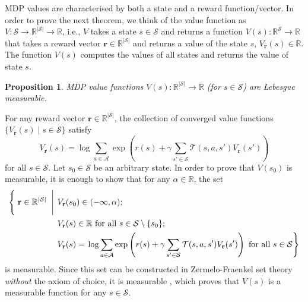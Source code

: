 \documentclass{article}
\newtheorem{proposition}[theorem]{Proposition}
\newenvironment{proofsketch}{%
  \renewcommand{\proofname}{Proof sketch}\proof}{\endproof}
\theoremstyle{definition}
\begin{document}
MDP values are characterised by both a state and a reward function/vector. In
order to prove the next theorem, we think of the value function as $V :
\mathcal{S} \to \mathbb{R}^{|\mathcal{S}|} \to \mathbb{R}$, i.e., $V$ takes a
state $s \in \mathcal{S}$ and returns a function $V(s) :
\mathbb{R}^{\mathcal{S}} \to \mathbb{R}$ that takes a reward vector $\mathbf{r}
\in \mathbb{R}^{|\mathcal{S}|}$ and returns a value of the state $s$,
$V_{\mathbf{r}}(s) \in \mathbb{R}$. The function $V(s)$ computes the values of
all states and returns the value of state $s$.

\begin{proposition} \label{thm:measurability}
  MDP value functions $V(s) : \mathbb{R}^{|\mathcal{S}|} \to \mathbb{R}$ (for $s
  \in \mathcal{S}$) are Lebesgue measurable.
\end{proposition}
\begin{proofsketch}
  For any reward vector $\mathbf{r} \in \mathbb{R}^{|\mathcal{S}|}$, the
  collection of converged value functions $\{ V_{\mathbf{r}}(s) \mid s \in
  \mathcal{S} \}$ satisfy
  \[
    V_{\mathbf{r}}(s) = \log \sum_{a \in \mathcal{A}}
    \exp\left( r(s) + \gamma\sum_{s' \in \mathcal{S}} \mathcal{T}(s, a,
      s')V_{\mathbf{r}}(s') \right)
  \]
  for all $s \in \mathcal{S}$. Let $s_0 \in \mathcal{S}$ be an arbitrary state.
  In order to prove that $V(s_0)$ is measurable, it is enough to show that for
  any $\alpha \in \mathbb{R}$, the set
  \[
    \begin{split}
      \left\{ \vphantom{\sum_{a \in \mathcal{A}}} \right. \mathbf{r} \in
      \mathbb{R}^{|\mathcal{S}|} \left. \vphantom{\sum_{a \in \mathcal{A}}} \;
        \middle| \; \right. &V_{\mathbf{r}}(s_0) \in (-\infty, \alpha); \\
      &V_{\mathbf{r}}(s) \in
      \mathbb{R} \text{ for all } s \in \mathcal{S} \setminus \{ s_0 \}; \\
      &V_{\mathbf{r}}(s) = \left. \log \sum_{a \in \mathcal{A}} \exp\left( r(s)
          + \gamma\sum_{s' \in \mathcal{S}} \mathcal{T}(s, a,
          s')V_{\mathbf{r}}(s') \right) \text{ for all } s \in
        \mathcal{S}\right\}
    \end{split}
  \]
  is measurable. Since this set can be constructed in Zermelo-Fraenkel set
  theory \emph{without} the axiom of choice, it is measurable
  \cite{herrlich2006axiom}, which proves that $V(s)$ is a measurable function
  for any $s \in \mathcal{S}$.
\end{proofsketch}
\end{document}
